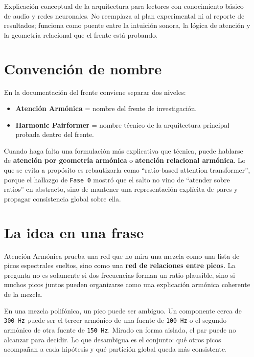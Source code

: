 \documentclass[11pt]{article}
\begin{document}

\begin{quietbox}
Explicación conceptual de la arquitectura para lectores con conocimiento básico de audio y redes neuronales. No reemplaza al plan experimental ni al reporte de resultados; funciona como puente entre la intuición sonora, la lógica de atención y la geometría relacional que el frente está probando.
\end{quietbox}

\section{Convención de nombre}

En la documentación del frente conviene separar dos niveles:

\begin{itemize}
  \item \textbf{Atención Armónica} = nombre del frente de investigación.
  \item \textbf{Harmonic Pairformer} = nombre técnico de la arquitectura principal probada dentro del frente.
\end{itemize}

Cuando haga falta una formulación más explicativa que técnica, puede hablarse de \textbf{atención por geometría armónica} o \textbf{atención relacional armónica}. Lo que se evita a propósito es rebautizarla como ``ratio-based attention transformer'', porque el hallazgo de \texttt{Fase 0} mostró que el salto no vino de ``atender sobre ratios'' en abstracto, sino de mantener una representación explícita de pares y propagar consistencia global sobre ella.

\section{La idea en una frase}

Atención Armónica prueba una red que no mira una mezcla como una lista de picos espectrales sueltos, sino como una \textbf{red de relaciones entre picos}. La pregunta no es solamente si dos frecuencias forman un ratio plausible, sino si muchos picos juntos pueden organizarse como una explicación armónica coherente de la mezcla.

En una mezcla polifónica, un pico puede ser ambiguo. Un componente cerca de \texttt{300 Hz} puede ser el tercer armónico de una fuente de \texttt{100 Hz} o el segundo armónico de otra fuente de \texttt{150 Hz}. Mirado en forma aislada, el par puede no alcanzar para decidir. Lo que desambigua es el conjunto: qué otros picos acompañan a cada hipótesis y qué partición global queda más consistente.
\end{document}
